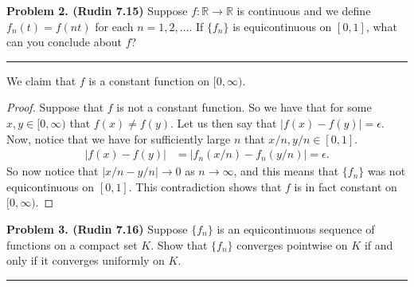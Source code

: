\documentclass[leqno]{article}
\theoremstyle{nonumberplain}
\newtheorem{proof}{Proof}
\newcommand{\R}{\mathbb{R}}
\begin{document}
\pagebreak



\noindent\textbf{Problem 2. (Rudin 7.15) } Suppose $f\colon  \R \to \R$ is continuous and we define $f_n(t)=f(nt)$ for each $n=1,2,\dots$. If $\{f_n\}$ is equicontinuous on $[0,1]$, what can you conclude about $f$?

\noindent\rule[0.5ex]{\linewidth}{1pt}

We claim that $f$ is a constant function on $[0,\infty)$.
\begin{proof}
Suppose that $f$ is not a constant function.  So we have that for some $x, y\in [0,\infty)$ that $f(x)\neq f(y)$.  Let us then say that $|f(x)-f(y)|=\epsilon$.  Now, notice that we have for sufficiently large $n$ that $x/n,y/n\in [0,1]$.  
\begin{align*}
|f(x)-f(y)|&=|f_n(x/n)-f_n(y/n)|=\epsilon.
\end{align*}
So now notice that $|x/n-y/n|\to 0$ as $n\to \infty$, and this means that $\{f_n\}$ was not equicontinuous on $[0,1]$.  This contradiction shows that $f$ is in fact constant on $[0,\infty)$.

\end{proof}


\pagebreak


\noindent\textbf{Problem 3. (Rudin 7.16) } Suppose $\{f_n\}$ is an equicontinuous sequence of functions on a compact set $K$. Show that $\{f_n\}$ converges pointwise on $K$ if and only if it converges uniformly on $K$.

\noindent\rule[0.5ex]{\linewidth}{1pt}
\end{document}
